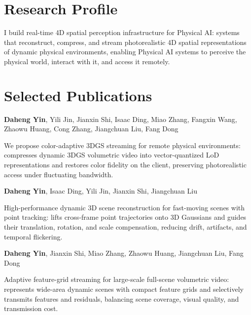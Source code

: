 \documentclass[]{deedy-resume-openfont}
\begin{document}
\begin{minipage}[t]{0.74\textwidth}

\section{Research Profile}
\begin{tightemize}
  \item I build real-time 4D spatial perception infrastructure for Physical AI: systems that reconstruct, compress, and stream photorealistic 4D spatial representations of dynamic physical environments, enabling Physical AI systems to perceive the physical world, interact with it, and access it remotely.
\end{tightemize}

\section{Selected Publications}
\begin{tightemize}
  \item \textbf{Daheng Yin}, Yili Jin, Jianxin Shi, Isaac Ding, Miao Zhang, Fangxin Wang, Zhaowu Huang, Cong Zhang, Jiangchuan Liu, Fang Dong
  \item We propose color-adaptive 3DGS streaming for remote physical environments: compresses dynamic 3DGS volumetric video into vector-quantized LoD representations and restores color fidelity on the client, preserving photorealistic access under fluctuating bandwidth.
\end{tightemize}

\begin{tightemize}
  \item \textbf{Daheng Yin}, Isaac Ding, Yili Jin, Jianxin Shi, Jiangchuan Liu
  \item High-performance dynamic 3D scene reconstruction for fast-moving scenes with point tracking: lifts cross-frame point trajectories onto 3D Gaussians and guides their translation, rotation, and scale compensation, reducing drift, artifacts, and temporal flickering.
\end{tightemize}

\begin{tightemize}
  \item \textbf{Daheng Yin}, Jianxin Shi, Miao Zhang, Zhaowu Huang, Jiangchuan Liu, Fang Dong
  \item Adaptive feature-grid streaming for large-scale full-scene volumetric video: represents wide-area dynamic scenes with compact feature grids and selectively transmits features and residuals, balancing scene coverage, visual quality, and transmission cost.
\end{tightemize}


\end{minipage}
\end{document}
